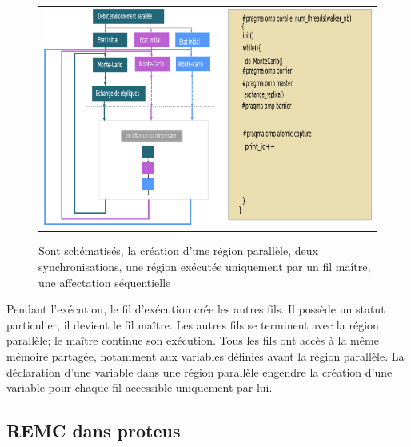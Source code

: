    \begin{figure}[!htbp]
     \centering
     \begin{tabular}{c}
       \includegraphics[width=14cm]{figure/openMP.png} 
     \end{tabular}     
     \caption{ Sont schématisés, la création d'une région parallèle, deux synchronisations, une région exécutée uniquement par un fil maître, une affectation séquentielle }
\label{fig:openMP}
   \end{figure}

Pendant l'exécution, le fil d'exécution crée les autres fils. Il possède un statut particulier, il devient le fil maître. Les autres fils se terminent avec la région parallèle; le maître continue son exécution. Tous les fils ont accès à la même mémoire partagée, notamment aux variables définies avant la région parallèle. La déclaration d'une variable dans une région parallèle engendre la création d'une variable pour chaque fil accessible uniquement par lui. 
   

\subsection{REMC dans proteus}

